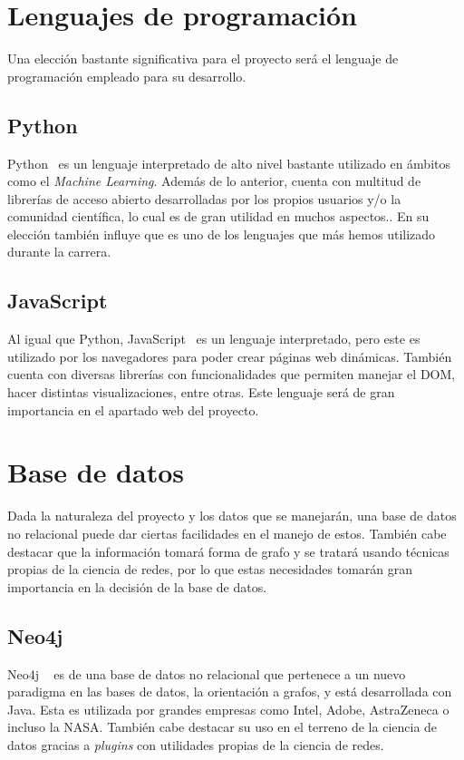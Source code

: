\section{Lenguajes de programación}

Una elección bastante significativa para el proyecto será el lenguaje de programación empleado
para su desarrollo.
\subsection{Python}
Python~\cite{Python} es un lenguaje interpretado de alto nivel bastante utilizado en ámbitos como el \textit{Machine Learning}.
Además de lo anterior, cuenta con multitud de librerías de acceso abierto desarrolladas por los propios usuarios y/o la comunidad científica, lo cual es de gran utilidad en muchos aspectos.. En su elección también influye que es uno de los lenguajes que más hemos
utilizado durante la carrera.
\subsection{JavaScript}
Al igual que Python, JavaScript~\cite{JS} es un lenguaje interpretado, pero este es utilizado por los
navegadores para poder crear páginas web dinámicas. También cuenta con diversas librerías con funcionalidades
que permiten manejar el DOM, hacer distintas visualizaciones, entre otras. Este lenguaje será de gran importancia
en el apartado web del proyecto.

\section{Base de datos}

Dada la naturaleza del proyecto y los datos que se manejarán, una base de datos no relacional
puede dar ciertas facilidades en el manejo de estos. También cabe destacar que la información
tomará forma de grafo y se tratará usando técnicas propias de la ciencia de redes, por lo que 
estas necesidades tomarán gran importancia en la decisión de la base de datos.


\subsection{Neo4j}

Neo4j ~\cite{neo4j} es de una base de datos no relacional que pertenece a un nuevo paradigma en las bases de datos, la orientación a grafos, y está desarrollada con Java. Esta
es utilizada por grandes empresas como Intel, Adobe, AstraZeneca o incluso la NASA. También cabe destacar
su uso en el terreno de la ciencia de datos gracias a \textit{plugins} con utilidades propias de la ciencia de redes.

